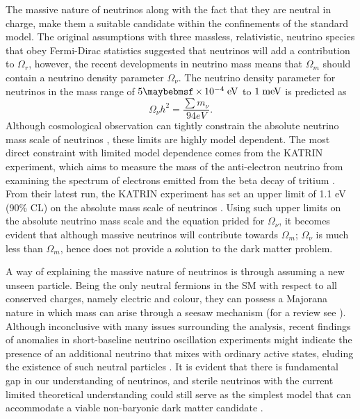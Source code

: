 The massive nature of neutrinos along with the fact that they are neutral in charge, make them a suitable candidate within the confinements of the standard model. The original assumptions with three massless, relativistic, neutrino species that obey Fermi-Dirac statistics suggested that neutrinos will add a contribution to $\Omega_{r}$, however, the recent developments in neutrino mass means that $\Omega_{m}$ should contain a neutrino density parameter $\Omega_{\nu}$. The neutrino density parameter for neutrinos in the mass range of $5 \times 10^{-4} \; \MathText{eV}$ to $1 \; \text{meV}$ is predicted as \cite{Jungman_1996}
%
\begin{equation}
    \Omega_{\nu}h^{2} = \frac{\sum{m_\nu}}{94eV}.
\end{equation}
%
Although cosmological observation can tightly constrain the absolute neutrino mass scale of neutrinos \cite{Lesgourgues_2012}, these limits are highly model dependent. The most direct constraint with limited model dependence comes from the KATRIN experiment, which aims to measure the mass of the anti-electron neutrino from examining the spectrum of electrons emitted from the beta decay of tritium \cite{katrin_experiment}. From their latest run, the KATRIN experiment has set an upper limit of 1.1 eV (90\% CL) on the absolute mass scale of neutrinos \cite{katrin_results}. Using such upper limits on the absolute neutrino mass scale and the equation prided for $\Omega_{\nu}$, it becomes evident that although massive neutrinos will contribute towards $\Omega_{m}$; $\Omega_{\nu}$ is much less than $\Omega_{m}$, hence does not provide a solution to the dark matter problem.

A way of explaining the massive nature of neutrinos is through assuming a new unseen particle. Being the only neutral fermions in the SM with respect to all conserved charges, namely electric and colour, they can possess a Majorana nature in which mass can arise through a seesaw mechanism (for a review see \cite{King_2003}). Although inconclusive with many issues surrounding the analysis, recent findings of anomalies in short-baseline neutrino oscillation experiments might indicate the presence of an additional neutrino that mixes with ordinary active states, eluding the existence of such neutral particles \cite{Gariazzo_2015, Aguilar_Arevalo_2018}. It is evident that there is fundamental gap in our understanding of neutrinos, and sterile neutrinos with the current limited theoretical understanding could still serve as the simplest model that can accommodate a viable non-baryonic dark matter candidate \cite{Dodelson_1994}.


